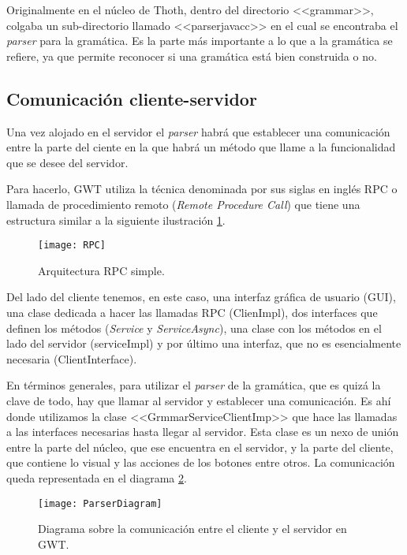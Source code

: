 Originalmente en el núcleo de Thoth, dentro del directorio <<grammar>>, colgaba un sub-directorio llamado <<parserjavacc>> en el cual se encontraba el \emph{parser} para la gramática. Es la parte más importante a lo que a la gramática se refiere, ya que permite reconocer si una gramática está bien construida o no.


\subsection{Comunicación cliente-servidor}
Una vez alojado en el servidor el \emph{parser} habrá que establecer una comunicación entre la parte del ciente en la que habrá un método que llame a la funcionalidad que se desee del servidor.

Para hacerlo, GWT utiliza la técnica denominada por sus siglas en inglés RPC o llamada de procedimiento remoto (\emph{Remote Procedure Call}) que tiene una estructura similar a la siguiente ilustración \ref{fig:5.1}.

\begin{figure}[h]
\centering
\texttt{[image: RPC]}
\caption{Arquitectura RPC simple.}
\label{fig:5.1}
\end{figure}

Del lado del cliente tenemos, en este caso, una interfaz gráfica de usuario (GUI), una clase dedicada a hacer las llamadas RPC (ClienImpl), dos interfaces que definen los métodos (\emph{Service} y \emph{ServiceAsync}), una clase con los métodos en el lado del servidor (serviceImpl) y por último una interfaz, que no es esencialmente necesaria (ClientInterface). 

En términos generales, para utilizar el \emph{parser} de la gramática, que es quizá la clave de todo, hay que llamar al servidor y establecer una comunicación. Es ahí donde utilizamos la clase <<GrmmarServiceClientImp>> que hace las llamadas a las interfaces necesarias hasta llegar al servidor. Esta clase es un nexo de unión entre la parte del núcleo, que ese encuentra en el servidor, y la parte del cliente, que contiene lo visual y las acciones de los botones entre otros. La comunicación queda representada en el diagrama \ref{fig:5.2}.

\begin{figure}[h]
\centering
\texttt{[image: ParserDiagram]}
\caption{Diagrama sobre la comunicación entre el cliente y el servidor en GWT.}
\label{fig:5.2}
\end{figure}

